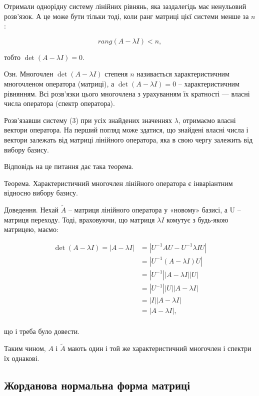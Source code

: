 Отримали однорідну систему лінійних рівнянь, яка заздалегідь має
ненульовий розв’язок. А це може бути тільки тоді, коли ранг матриці цієї
системи менше за $n$:

$$rang(A - \lambda I) < n,$$

тобто $\det(A - \lambda I) = 0$.

Озн. Многочлен $\det(A - \lambda I)$ степеня $n$ називається характеристичним
многочленом оператора (матриці), а $\det(A - \lambda I) = 0$ -- характеристичним
рівнянням. Всі розв’язки цього многочлена з урахуванням їх кратності ---
власні числа оператора (спектр оператора).

Розв’язавши систему (3) при усіх знайдених значеннях $\lambda$, отримаємо
власні вектори оператора. На перший погляд може здатися, що знайдені
власні числа і вектори залежать від матриці лінійного оператора, яка в свою
чергу залежить від вибору базису.

Відповідь на це питання дає така теорема.

Теорема. Характеристичний многочлен лінійного оператора є
інваріантним відносно вибору базису. 

Доведення. Нехай $\tilde{A}$ -- матриця лінійного оператора у «новому» базисі,
а U -- матриця переходу. Тоді, враховуючи, що матриця $\lambda I$ комутує з
будь-якою матрицею, маємо:

\begin{equation*}
    \begin{split}
        \det(A - \lambda I) = |A - \lambda I|
        & = |U^{-1} A U - U^{-1} \lambda I U|\\
        & = |U^{-1} (A - \lambda I) U|\\
        & = |U^{-1}| |A - \lambda I| |U|\\
        & = |U^{-1}| |U| |A - \lambda I|\\
        & = |I| |A - \lambda I|\\
        & = |A - \lambda I|,\\
    \end{split}
\end{equation*}

що і треба було довести.


Таким чином, $A$ і $\tilde{A}$ мають один і той же характеристичний многочлен
і спектри їх однакові.

\subsection{Жорданова нормальна форма матриці}

